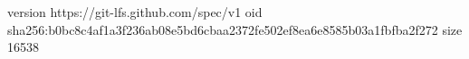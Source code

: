 version https://git-lfs.github.com/spec/v1
oid sha256:b0bc8c4af1a3f236ab08e5bd6cbaa2372fe502ef8ea6e8585b03a1fbfba2f272
size 16538

